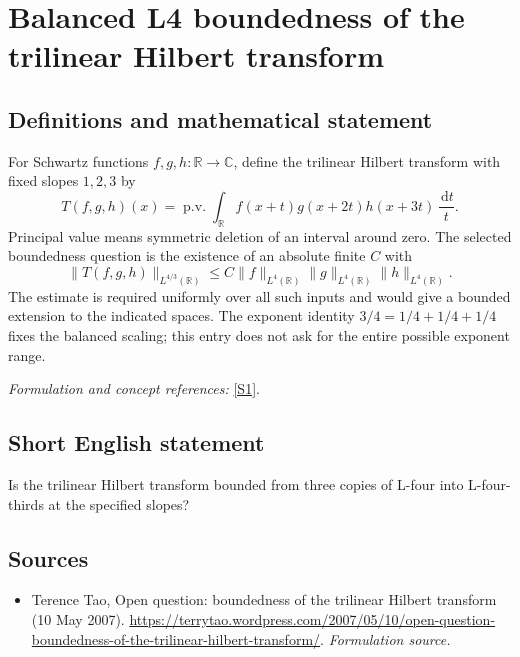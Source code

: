 \documentclass[11pt]{article}
\begin{document}
\section*{\texorpdfstring{Balanced L4 boundedness of the trilinear Hilbert transform}{Balanced L4 boundedness of the trilinear Hilbert transform}}\label{30006939}
\subsection{Definitions and mathematical statement}
For Schwartz functions $f,g,h:{\mathbb{R}}\to{\mathbb{C}}$, define the trilinear Hilbert transform with fixed slopes $1,2,3$ by
\[
 T(f,g,h)(x)=\operatorname{p.v.}\int_{{\mathbb{R}}}
 f(x+t)g(x+2t)h(x+3t)\,\frac{{\,\mathrm{d}} t}{t}.
\]
Principal value means symmetric deletion of an interval around zero. The selected boundedness question is the existence of an absolute finite $C$ with
\[
 \|T(f,g,h)\|_{L^{4/3}({\mathbb{R}})}
 \le C\|f\|_{L^4({\mathbb{R}})}\|g\|_{L^4({\mathbb{R}})}\|h\|_{L^4({\mathbb{R}})}.
\]
The estimate is required uniformly over all such inputs and would give a bounded extension to the indicated spaces. The exponent identity $3/4=1/4+1/4+1/4$ fixes the balanced scaling; this entry does not ask for the entire possible exponent range.
\par\smallskip\textit{Formulation and concept references:} \href{https://terrytao.wordpress.com/2007/05/10/open-question-boundedness-of-the-trilinear-hilbert-transform/}{[S1]}.

\subsection{Short English statement}
Is the trilinear Hilbert transform bounded from three copies of L-four into L-four-thirds at the specified slopes?
\subsection{Sources}
\begin{itemize}
\item[S1]Terence Tao, Open question: boundedness of the trilinear Hilbert transform (10 May 2007).
\url{https://terrytao.wordpress.com/2007/05/10/open-question-boundedness-of-the-trilinear-hilbert-transform/}.
\textit{Formulation source.}
\end{itemize}
\end{document}
